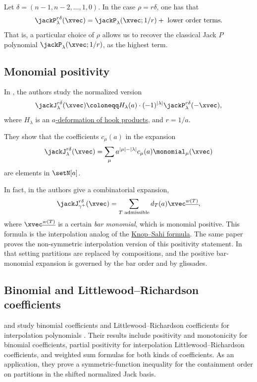 Let $\delta = (n-1,n-2,\dotsc,1,0)$.
In the case $\rho = r \delta$, one has that
\[
 \jackP^{r \delta}_\lambda(\xvec) = \jackP_\lambda(\xvec; 1/r) + \text{ lower order terms}.
\]
That is, a particular choice of $\rho$ allows us to recover the classical
Jack $P$ polynomial $\jackP_\lambda(\xvec; 1/r)$, as the highest term.

\subsection[jackJiMonomialPositivity]{Monomial positivity}

In \cite{NaqviSahiSergel2021x}, the authors study the normalized version
\[
 \jackJ^{r \delta}_\lambda(\xvec) \coloneqq
 H_\lambda(a) \cdot (-1)^{|\lambda|} \jackP^{r \delta}_\lambda(-\xvec),
\]
where $H_\lambda$ is an \hyperref[jackJ]{$a$-deformation of hook products},
and $r = 1/a$.

They show that the coefficients $c_{\mu}(a)$ in the expansion
\[
\jackJ^{r \delta}_\lambda(\xvec) = \sum_{\mu} a^{|\mu|-|\lambda|} c_{\mu}(a) \monomial_\mu(\xvec)
\]
are elements in $\setN[a]$.

In fact, in \cite[Thm. 5.4]{NaqviSahiSergel2021x} the authors give a combinatorial expansion,
\[
\jackJ^{r \delta}_{\gamma^+}(\xvec) = \sum_{\text{$T$ admissible}} d_T(a) \xvec^{\underline{w(T)}},
\]
where $ \xvec^{\underline{w(T)}}$ is a certain \emph{bar monomial}, which is monomial positive.
This formula is the interpolation analog of the \hyperref[jackCombinatorialFormula]{Knop--Sahi formula}.
The same paper proves the non-symmetric interpolation version of this
positivity statement.  In that setting partitions are replaced by
compositions, and the positive bar-monomial expansion is governed by the
bar order and by glissades.

\subsection[jackPiLR]{Binomial and Littlewood--Richardson coefficients}

 and  study binomial coefficients and
Littlewood--Richardson coefficients for interpolation polynomials
\cite{ChenSahi2024x}.  Their results include positivity and monotonicity for
binomial coefficients, partial positivity for interpolation
Littlewood--Richardson coefficients, and weighted sum formulas for both
kinds of coefficients.  As an application, they prove a symmetric-function
inequality for the containment order on partitions in the shifted normalized
Jack basis.
